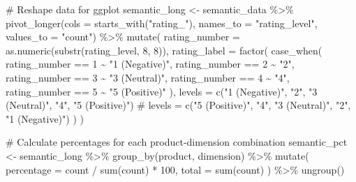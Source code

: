 \documentclass[
  letterpaper,
  DIV=11,
  numbers=noendperiod]{scrartcl}
\newenvironment{Shaded}{\begin{snugshade}}{\end{snugshade}}
\newcommand{\AttributeTok}[1]{\textcolor[rgb]{0.40,0.45,0.13}{#1}}
\newcommand{\CommentTok}[1]{\textcolor[rgb]{0.37,0.37,0.37}{#1}}
\newcommand{\DecValTok}[1]{\textcolor[rgb]{0.68,0.00,0.00}{#1}}
\newcommand{\FunctionTok}[1]{\textcolor[rgb]{0.28,0.35,0.67}{#1}}
\newcommand{\NormalTok}[1]{\textcolor[rgb]{0.00,0.23,0.31}{#1}}
\newcommand{\OtherTok}[1]{\textcolor[rgb]{0.00,0.23,0.31}{#1}}
\newcommand{\SpecialCharTok}[1]{\textcolor[rgb]{0.37,0.37,0.37}{#1}}
\newcommand{\StringTok}[1]{\textcolor[rgb]{0.13,0.47,0.30}{#1}}
\begin{document}
\begin{Shaded}
\begin{Highlighting}[]
\CommentTok{\# Reshape data for ggplot}
\NormalTok{semantic\_long }\OtherTok{\textless{}{-}}\NormalTok{ semantic\_data }\SpecialCharTok{\%\textgreater{}\%}
  \FunctionTok{pivot\_longer}\NormalTok{(}\AttributeTok{cols =} \FunctionTok{starts\_with}\NormalTok{(}\StringTok{"rating\_"}\NormalTok{),}
               \AttributeTok{names\_to =} \StringTok{"rating\_level"}\NormalTok{,}
               \AttributeTok{values\_to =} \StringTok{"count"}\NormalTok{) }\SpecialCharTok{\%\textgreater{}\%}
  \FunctionTok{mutate}\NormalTok{(}
    \AttributeTok{rating\_number =} \FunctionTok{as.numeric}\NormalTok{(}\FunctionTok{substr}\NormalTok{(rating\_level, }\DecValTok{8}\NormalTok{, }\DecValTok{8}\NormalTok{)),}
    \AttributeTok{rating\_label =} \FunctionTok{factor}\NormalTok{(}
      \FunctionTok{case\_when}\NormalTok{(}
\NormalTok{        rating\_number }\SpecialCharTok{==} \DecValTok{1} \SpecialCharTok{\textasciitilde{}} \StringTok{"1 (Negative)"}\NormalTok{,}
\NormalTok{        rating\_number }\SpecialCharTok{==} \DecValTok{2} \SpecialCharTok{\textasciitilde{}} \StringTok{"2"}\NormalTok{,}
\NormalTok{        rating\_number }\SpecialCharTok{==} \DecValTok{3} \SpecialCharTok{\textasciitilde{}} \StringTok{"3 (Neutral)"}\NormalTok{,}
\NormalTok{        rating\_number }\SpecialCharTok{==} \DecValTok{4} \SpecialCharTok{\textasciitilde{}} \StringTok{"4"}\NormalTok{,}
\NormalTok{        rating\_number }\SpecialCharTok{==} \DecValTok{5} \SpecialCharTok{\textasciitilde{}} \StringTok{"5 (Positive)"}
\NormalTok{      ),}
      \AttributeTok{levels =} \FunctionTok{c}\NormalTok{(}\StringTok{"1 (Negative)"}\NormalTok{, }\StringTok{"2"}\NormalTok{, }\StringTok{"3 (Neutral)"}\NormalTok{, }\StringTok{"4"}\NormalTok{, }\StringTok{"5 (Positive)"}\NormalTok{)}
      \CommentTok{\# levels = c("5 (Positive)", "4", "3 (Neutral)", "2", "1 (Negative)")}
\NormalTok{    )}
\NormalTok{  )}

\CommentTok{\# Calculate percentages for each product{-}dimension combination}
\NormalTok{semantic\_pct }\OtherTok{\textless{}{-}}\NormalTok{ semantic\_long }\SpecialCharTok{\%\textgreater{}\%}
  \FunctionTok{group\_by}\NormalTok{(product, dimension) }\SpecialCharTok{\%\textgreater{}\%}
  \FunctionTok{mutate}\NormalTok{(}
    \AttributeTok{percentage =}\NormalTok{ count }\SpecialCharTok{/} \FunctionTok{sum}\NormalTok{(count) }\SpecialCharTok{*} \DecValTok{100}\NormalTok{,}
    \AttributeTok{total =} \FunctionTok{sum}\NormalTok{(count)}
\NormalTok{  ) }\SpecialCharTok{\%\textgreater{}\%}
  \FunctionTok{ungroup}\NormalTok{()}


\end{Highlighting}
\end{Shaded}
\end{document}

